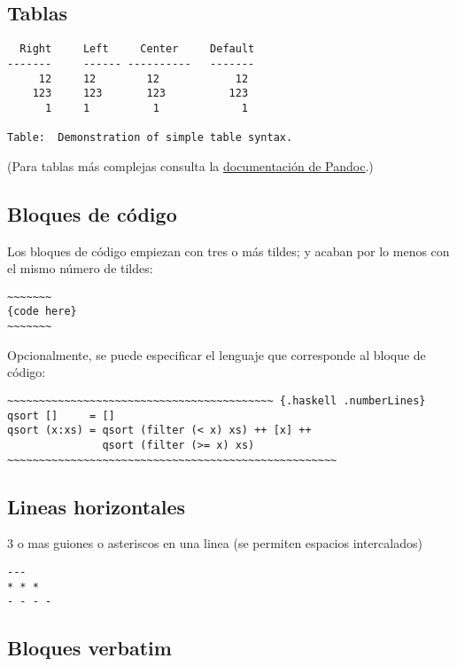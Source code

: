 \documentclass[12pt,spanish,]{article}
\begin{document}
\hypertarget{tablas}{%
\subsection{Tablas}\label{tablas}}

\begin{verbatim}
  Right     Left     Center     Default
-------     ------ ----------   -------
     12     12        12            12
    123     123       123          123
      1     1          1             1

Table:  Demonstration of simple table syntax.
\end{verbatim}

(Para tablas más complejas consulta la
\href{http://pandoc.org/README.html\#tables}{documentación de Pandoc}.)

\hypertarget{bloques-de-cuxf3digo}{%
\subsection{Bloques de código}\label{bloques-de-cuxf3digo}}

Los bloques de código empiezan con tres o más tildes; y acaban por lo
menos con el mismo número de tildes:

\begin{verbatim}
~~~~~~~
{code here}
~~~~~~~
\end{verbatim}

Opcionalmente, se puede especificar el lenguaje que corresponde al
bloque de código:

\begin{verbatim}
~~~~~~~~~~~~~~~~~~~~~~~~~~~~~~~~~~~~~~~~~~ {.haskell .numberLines}
qsort []     = []
qsort (x:xs) = qsort (filter (< x) xs) ++ [x] ++
               qsort (filter (>= x) xs)
~~~~~~~~~~~~~~~~~~~~~~~~~~~~~~~~~~~~~~~~~~~~~~~~~~~~
\end{verbatim}

\hypertarget{lineas-horizontales}{%
\subsection{Lineas horizontales}\label{lineas-horizontales}}

3 o mas guiones o asteriscos en una linea (se permiten espacios
intercalados)

\begin{verbatim}
---
* * *
- - - -
\end{verbatim}

\hypertarget{bloques-verbatim}{%
\subsection{Bloques verbatim}\label{bloques-verbatim}}
\end{document}
